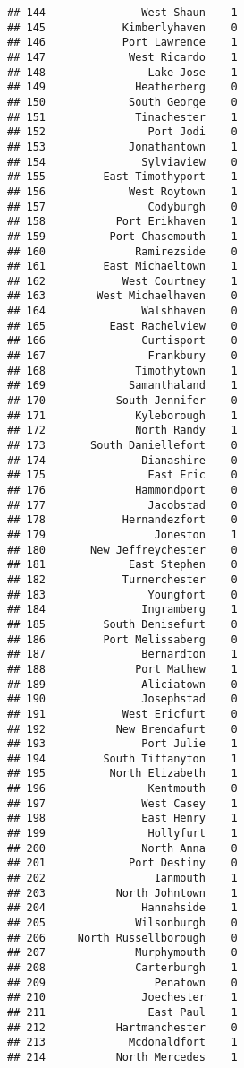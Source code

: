 \documentclass[
]{article}
\begin{document}
\begin{verbatim}
## 144               West Shaun    1
## 145            Kimberlyhaven    0
## 146            Port Lawrence    1
## 147             West Ricardo    1
## 148                Lake Jose    1
## 149              Heatherberg    0
## 150             South George    0
## 151              Tinachester    1
## 152                Port Jodi    0
## 153             Jonathantown    1
## 154               Sylviaview    0
## 155         East Timothyport    1
## 156             West Roytown    1
## 157                Codyburgh    0
## 158           Port Erikhaven    1
## 159          Port Chasemouth    1
## 160              Ramirezside    0
## 161         East Michaeltown    1
## 162            West Courtney    1
## 163        West Michaelhaven    0
## 164               Walshhaven    0
## 165          East Rachelview    0
## 166               Curtisport    0
## 167                Frankbury    0
## 168              Timothytown    1
## 169             Samanthaland    1
## 170           South Jennifer    0
## 171              Kyleborough    1
## 172              North Randy    1
## 173       South Daniellefort    0
## 174               Dianashire    0
## 175                East Eric    0
## 176              Hammondport    0
## 177                Jacobstad    0
## 178            Hernandezfort    0
## 179                 Joneston    1
## 180       New Jeffreychester    0
## 181             East Stephen    0
## 182            Turnerchester    0
## 183                Youngfort    0
## 184               Ingramberg    1
## 185         South Denisefurt    0
## 186         Port Melissaberg    0
## 187               Bernardton    1
## 188              Port Mathew    1
## 189               Aliciatown    0
## 190               Josephstad    0
## 191            West Ericfurt    0
## 192           New Brendafurt    0
## 193               Port Julie    1
## 194         South Tiffanyton    1
## 195          North Elizabeth    1
## 196                Kentmouth    0
## 197               West Casey    1
## 198               East Henry    1
## 199                Hollyfurt    1
## 200               North Anna    0
## 201             Port Destiny    0
## 202                 Ianmouth    1
## 203           North Johntown    1
## 204               Hannahside    1
## 205              Wilsonburgh    0
## 206     North Russellborough    0
## 207              Murphymouth    0
## 208              Carterburgh    1
## 209                 Penatown    0
## 210               Joechester    1
## 211                East Paul    1
## 212           Hartmanchester    0
## 213             Mcdonaldfort    1
## 214           North Mercedes    1

\end{verbatim}
\end{document}
